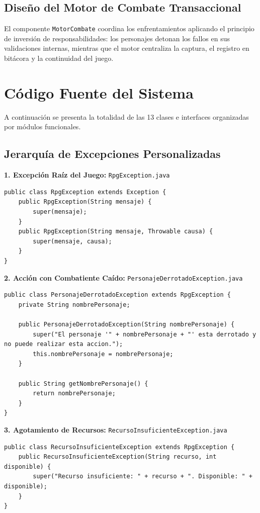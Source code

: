 \documentclass[11pt,letterpaper]{article}
\begin{document}
\subsection{Diseño del Motor de Combate Transaccional}
El componente \texttt{MotorCombate} coordina los enfrentamientos aplicando el principio de inversión de responsabilidades: los personajes detonan los fallos en sus validaciones internas, mientras que el motor centraliza la captura, el registro en bitácora y la continuidad del juego.

\section{Código Fuente del Sistema}

A continuación se presenta la totalidad de las 13 clases e interfaces organizadas por módulos funcionales.

\subsection{Jerarquía de Excepciones Personalizadas}

\textbf{1. Excepción Raíz del Juego:} \texttt{RpgException.java}
\begin{lstlisting}[style=JavaStyle]
public class RpgException extends Exception {
    public RpgException(String mensaje) {
        super(mensaje);
    }
    public RpgException(String mensaje, Throwable causa) {
        super(mensaje, causa);
    }
}
\end{lstlisting}

\textbf{2. Acción con Combatiente Caído:} \texttt{PersonajeDerrotadoException.java}
\begin{lstlisting}[style=JavaStyle]
public class PersonajeDerrotadoException extends RpgException {
    private String nombrePersonaje;

    public PersonajeDerrotadoException(String nombrePersonaje) {
        super("El personaje '" + nombrePersonaje + "' esta derrotado y no puede realizar esta accion.");
        this.nombrePersonaje = nombrePersonaje;
    }

    public String getNombrePersonaje() {
        return nombrePersonaje;
    }
}
\end{lstlisting}

\textbf{3. Agotamiento de Recursos:} \texttt{RecursoInsuficienteException.java}
\begin{lstlisting}[style=JavaStyle]
public class RecursoInsuficienteException extends RpgException {
    public RecursoInsuficienteException(String recurso, int disponible) {
        super("Recurso insuficiente: " + recurso + ". Disponible: " + disponible);
    }
}
\end{lstlisting}
\end{document}
